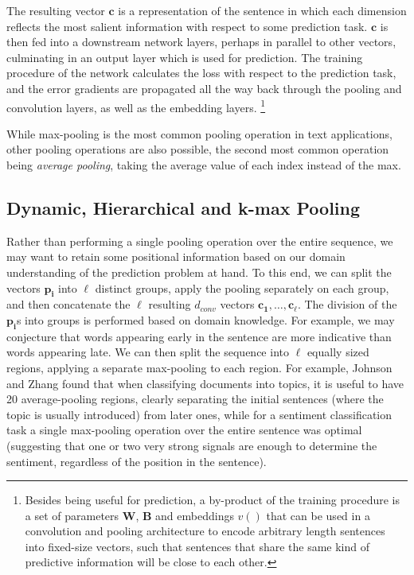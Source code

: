 \documentclass[jair,twoside,11pt,theapa]{article}
\newcommand{\m}[1]{\mathbf{#1}}%
\begin{document}
{The resulting vector $\m{c}$ is a representation of the sentence in which each dimension
reflects the most salient information with respect to some prediction task.
$\m{c}$ is then fed into a downstream network layers, perhaps in parallel to
other vectors, culminating in an output layer which is used for prediction.  The
training procedure of the network calculates the loss with respect to the
prediction task, and the error gradients are propagated all the way back through
the pooling and convolution layers, as well as the embedding layers.
\footnote{Besides being useful for prediction, a by-product of the training
procedure is a set of parameters $\m{W}$, $\m{B}$ and embeddings $v()$ that can
be used in a convolution and pooling architecture to encode arbitrary length
sentences into fixed-size vectors, such that sentences that share the same kind
of predictive information will be close to each other.}

While max-pooling is the most common pooling operation in text applications,
other pooling operations are also possible, the second most common operation
being \emph{average pooling}, taking the average value of each index instead of
the max.

\subsection{Dynamic, Hierarchical and k-max Pooling} 

Rather than performing a single pooling operation over the entire sequence, we
may want to retain some positional information based on our domain understanding
of the prediction problem at hand.  To this end, we can split the vectors
$\m{p_i}$ into $\ell$ distinct groups, apply the pooling separately on each group,
and then concatenate the $\ell$ resulting $d_{conv}$ vectors $
\m{c_1},\ldots,\m{c_\ell}$.  The division of the $\m{p_i}$s into groups is performed
based on domain knowledge. For example, we may conjecture that words appearing
early in the sentence are more indicative than words appearing late. We
can then split the sequence into $\ell$ equally sized regions, applying a separate
max-pooling to each region.  For example, Johnson and Zhang
\cite{johnson2014effective} found
that when classifying documents into topics, it is useful to have 20
average-pooling regions, clearly separating the initial sentences (where
the topic is usually introduced) from later ones, while for a sentiment
classification task a single max-pooling operation over the entire sentence was
optimal (suggesting that one or two very strong signals are enough to determine
the sentiment, regardless of the position in the sentence).

}
\end{document}
